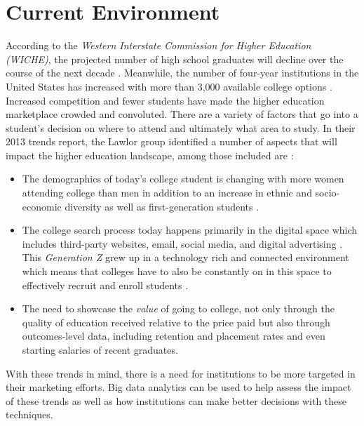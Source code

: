 \documentclass[sigconf]{acmart}
\begin{document}
\section{Current Environment}

According to the \textit{Western Interstate Commission for Higher Education (WICHE)}, the projected number of high school graduates will decline over the course of the next decade \cite{Bransberger2017}. Meanwhile, the number of four-year institutions in the United States has increased with more than 3,000 available college options \cite{EducationStatistics2015}. Increased competition and fewer students have made the higher education marketplace crowded and convoluted. There are a variety of factors that go into a student's decision on where to attend and ultimately what area to study. In their 2013 trends report, the Lawlor group  identified a number of aspects that will impact the higher education landscape, among those included are \cite{Research2014}:

\begin{itemize}
\item The demographics of today's college student is changing with more women attending college than men in addition to an increase in ethnic and socio-economic diversity as well as first-generation students \cite{Bransberger2017}.

\item The college search process today happens primarily in the digital space which includes third-party websites, email, social media, and digital advertising \cite{Geyer2016}. This \textit{Generation Z} grew up in a technology rich and connected environment which means that colleges have to also be constantly on in this space to effectively recruit and enroll students \cite{Geyer2016}.

\item The need to showcase the \textit{value} of going to college, not only through the quality of education received relative to the price paid but also through outcomes-level data, including retention and placement rates and even starting salaries of recent graduates. 
\end{itemize}

With these trends in mind, there is a need for institutions to be more targeted in their marketing efforts. Big data analytics can be used to help assess the impact of these trends as well as how institutions can make better decisions with these techniques.
\end{document}
